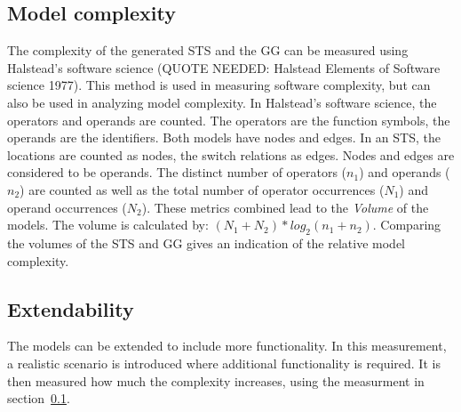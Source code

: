 \subsection{Model complexity}\label{sec:complexity_measurement}
The complexity of the generated STS and the GG can be measured using Halstead's software science (QUOTE NEEDED: Halstead Elements of Software science 1977). This method is used in measuring software complexity, but can also be used in analyzing model complexity. In Halstead's software science, the operators and operands are counted. The operators are the function symbols, the operands are the identifiers. Both models have nodes and edges. In an STS, the locations are counted as nodes, the switch relations as edges. Nodes and edges are considered to be operands. The distinct number of operators ($n_1$) and operands ($n_2$) are counted as well as the total number of operator occurrences ($N_1$) and operand occurrences ($N_2$). These metrics combined lead to the \textit{Volume} of the models. The volume is calculated by: $(N_1+N_2)*\mathit{log}_2(n_1+n_2)$. Comparing the volumes of the STS and GG gives an indication of the relative model complexity.

\subsection{Extendability}
The models can be extended to include more functionality. In this measurement, a realistic scenario is introduced where additional functionality is required. It is then measured how much the complexity increases, using the measurment in section~\ref{sec:complexity_measurement}.

